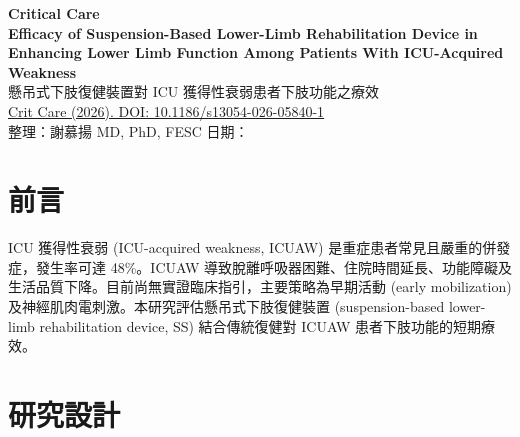 \documentclass[11pt,a4paper]{article}
\begin{document}
\begin{center}
{\LARGE\bfseries\textcolor{emergency_red}{Critical Care}}\\[0.5cm]
{\Large\textbf{Efficacy of Suspension-Based Lower-Limb Rehabilitation Device in Enhancing Lower Limb Function Among Patients With ICU-Acquired Weakness}}\\[0.3cm]
{\large 懸吊式下肢復健裝置對 ICU 獲得性衰弱患者下肢功能之療效}\\[0.5cm]
{\normalsize \href{https://doi.org/10.1186/s13054-026-05840-1}{Crit Care (2026). DOI: 10.1186/s13054-026-05840-1}}\\[0.3cm]
{\normalsize 整理：謝慕揚 MD, PhD, FESC \quad 日期：\mydate}
\end{center}

\vspace{0.5cm}

\section{前言}

ICU 獲得性衰弱 (ICU-acquired weakness, ICUAW) 是重症患者常見且嚴重的併發症，發生率可達 48\%。ICUAW 導致脫離呼吸器困難、住院時間延長、功能障礙及生活品質下降。目前尚無實證臨床指引，主要策略為早期活動 (early mobilization) 及神經肌肉電刺激。本研究評估懸吊式下肢復健裝置 (suspension-based lower-limb rehabilitation device, SS) 結合傳統復健對 ICUAW 患者下肢功能的短期療效。


\section{研究設計}
\end{document}

